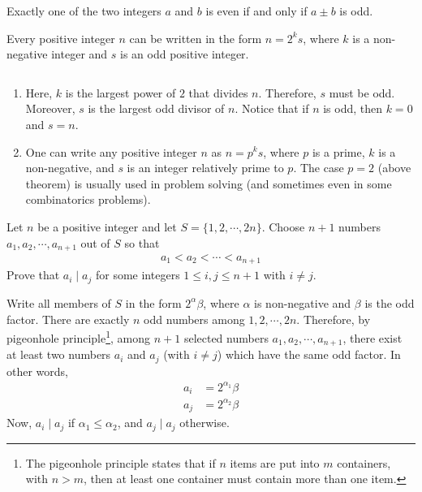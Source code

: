 \begin{corollary}\label{cor:sumparity}
	Exactly one of the two integers $a$ and $b$ is even if and only if $a\pm b$ is odd.
\end{corollary}

\begin{theorem}\label{thm:factorizeintopowersoftwo}
	Every positive integer $n$ can be written in the form $n=2^ks$, where $k$ is a non-negative integer and $s$ is an odd positive integer.
\end{theorem}

\begin{note}
	$ $
	\begin{enumerate}
		\item Here, $k$ is the largest power of $2$ that divides $n$. Therefore, $s$ must be odd. Moreover, $s$ is the largest odd divisor of $n$. Notice that if $n$ is odd, then $k=0$ and $s=n$.
		\item  One can write any positive integer $n$ as $n=p^ks$, where $p$ is a prime, $k$ is a non-negative, and $s$ is an integer relatively prime to $p$. The case $p=2$ (above theorem) is usually used in problem solving (and sometimes even in some combinatorics problems).
	\end{enumerate}
\end{note}

\begin{problem}
	Let $n$ be a positive integer and let $S=\{1,2,\cdots,2n\}$. Choose $n+1$ numbers $a_1,a_2,\cdots, a_{n+1}$ out of $S$ so that
	\begin{align*}
		a_1<a_2<\cdots <a_{n+1}
	\end{align*}
	Prove that $a_i\mid a_j$ for some integers $1 \leq i,j \leq n+1$ with $i\neq j$.
\end{problem}

\begin{solution}
	Write all members of $S$ in the form $2^{\alpha}\beta$, where $\alpha$ is non-negative and $\beta$ is the odd factor. There are exactly $n$ odd numbers among $1,2,\cdots,2n$. Therefore, by pigeonhole principle\footnote{The pigeonhole principle states that if $n$ items are put into $m$ containers, with $n > m$, then at least one container must contain more than one item.}, among $n+1$ selected numbers $a_1,a_2,\cdots, a_{n+1}$, there exist at least two numbers $a_i$ and $a_j$ (with $i\neq j$) which have the same odd factor. In other words,
	\begin{align*}
		a_i
			& = 2^{\alpha_1}\beta\\
		a_j
			& = 2^{\alpha_2}\beta
	\end{align*}
	Now, $a_i\mid a_j$ if $\alpha_1\leq \alpha_2$, and $a_j\mid a_j$ otherwise.
\end{solution}


